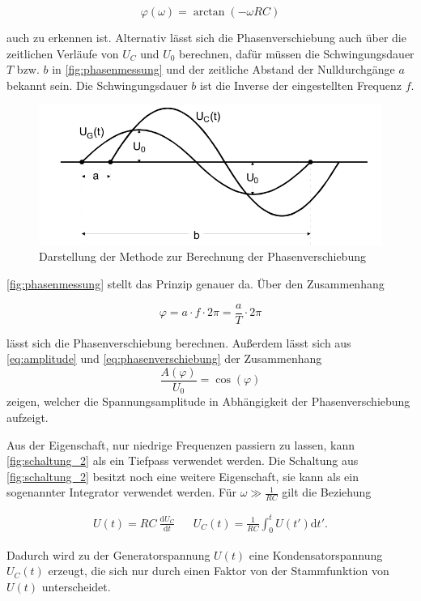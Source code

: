 \begin{equation}
    \label{eq:phasenverschiebung}
    \varphi (\omega) = \arctan \left(-\omega R C \right)
\end{equation}

auch zu erkennen ist. Alternativ lässt sich die Phasenverschiebung auch über die zeitlichen Verläufe von $U_C$ und $U_0$ berechnen, dafür müssen die Schwingungsdauer $T$ bzw. $b$ in \autoref{fig:phasenmessung} und der zeitliche Abstand der Nulldurchgänge $a$ bekannt sein. Die Schwingungsdauer $b$ ist die Inverse der eingestellten Frequenz $f$.

\begin{figure}
    \centering
    \includegraphics[width=\textwidth/2]{images/phasenmessung.png}
    \caption{Darstellung der Methode zur Berechnung der Phasenverschiebung  \cite{V353}}
    \label{fig:phasenmessung}
\end{figure}

\autoref{fig:phasenmessung} stellt das Prinzip genauer da. Über den Zusammenhang

\begin{equation}
    \label{eq:phasenverschiebung2}
    \varphi = a \cdot f \cdot 2\pi = \frac{a}{T} \cdot 2\pi
\end{equation}

lässt sich die Phasenverschiebung berechnen.
Außerdem lässt sich aus \autoref{eq:amplitude} und \autoref{eq:phasenverschiebung} der Zusammenhang
\begin{equation}
    \label{eq:spannung_phase}
    \frac{A(\varphi)}{U_0} = \cos(\varphi)
\end{equation}
zeigen, welcher die Spannungsamplitude in Abhängigkeit der Phasenverschiebung aufzeigt.

Aus der Eigenschaft, nur niedrige Frequenzen passiern zu lassen, kann \autoref{fig:schaltung_2} als ein Tiefpass verwendet werden. \cite{V353}
Die Schaltung aus \autoref{fig:schaltung_2} besitzt noch eine weitere Eigenschaft, sie kann als ein sogenannter Integrator verwendet werden. Für $\omega \gg \frac{1}{RC}$ gilt die Beziehung

\begin{align}
    \label{eq:integrator}
    U (t) = RC \: \frac{\mathrm{d} U_C}{\mathrm{d}t}  && U_C (t) = \frac{1}{RC} \int _0^t U (t') \mathrm{d} t'.
\end{align}

Dadurch wird zu der Generatorspannung $U (t)$ eine Kondensatorspannung $U_C (t)$ erzeugt, die sich nur durch einen Faktor von der Stammfunktion von $U(t)$ unterscheidet. \cite{V353}